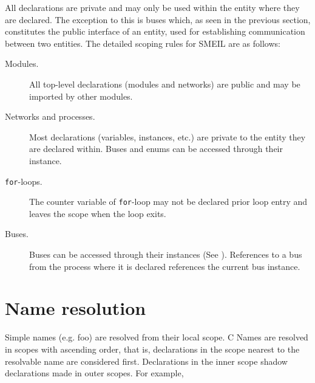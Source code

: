 All declarations are private and may only be used within the entity where they
are declared. The exception to this is buses which, as seen in the previous
section, constitutes the public interface of an entity, used for establishing
communication between two entities.
The detailed scoping rules for SMEIL are as follows:

\begin{description}
  \item[Modules.] All top-level declarations (modules and networks) are public and
    may be imported by other modules.
  \item[Networks and processes.] Most declarations (variables, instances, etc.)
    are private to the entity they are declared within. Buses and enums can be
    accessed through their instance.
  \item[\texttt{for}-loops.] The counter variable of \texttt{for}-loop may not
    be declared prior loop entry and leaves the scope when the loop exits.
  \item[Buses.] Buses can be accessed through their instances (See
    ). References to a bus from the process where it is
    declared references the current bus instance.
\end{description}



\section{Name resolution}
Simple names (e.g. {\ttfamily foo}) are resolved from their local scope. C
Names are resolved in scopes with ascending order, that is, declarations in the
scope nearest to the resolvable name are considered first. Declarations in the
inner scope shadow declarations made in outer scopes. For example, 

